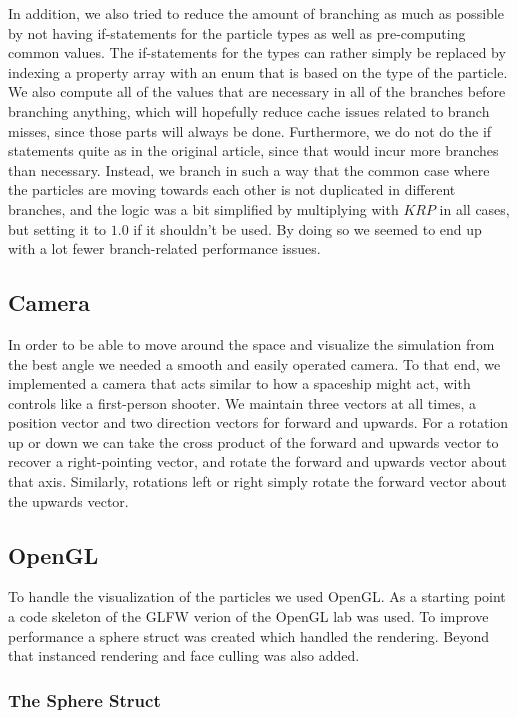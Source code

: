 \documentclass[a4paper]{article}
\begin{document}
In addition, we also tried to reduce the amount of branching as much as possible by not having if-statements for the particle types as well as pre-computing common values.
The if-statements for the types can rather simply be replaced by indexing a property array with an enum that is based on the type of the particle.
We also compute all of the values that are necessary in all of the branches before branching anything, which will hopefully reduce cache issues related to branch misses, since those parts will always be done.
Furthermore, we do not do the if statements quite as in the original article, since that would incur more branches than necessary.
Instead, we branch in such a way that the common case where the particles are moving towards each other is not duplicated in different branches, and the logic was a bit simplified by multiplying with $KRP$ in all cases, but setting it to $1.0$ if it shouldn't be used.
By doing so we seemed to end up with a lot fewer branch-related performance issues.


\subsection{Camera}

In order to be able to move around the space and visualize the simulation from the best angle we needed a smooth and easily operated camera.
To that end, we implemented a camera that acts similar to how a spaceship might act, with controls like a first-person shooter.
We maintain three vectors at all times, a position vector and two direction vectors for forward and upwards.
For a rotation up or down we can take the cross product of the forward and upwards vector to recover a right-pointing vector, and rotate the forward and upwards vector about that axis.
Similarly, rotations left or right simply rotate the forward vector about the upwards vector.

\subsection{OpenGL}

To handle the visualization of the particles we used OpenGL\cite{opengl}. 
As a starting point a code skeleton of the GLFW verion of the OpenGL lab was used. 
To improve performance a sphere struct was created which handled the rendering. 
Beyond that instanced rendering and face culling was also added. 

\subsubsection{The Sphere Struct}
\label{sphere_struct}
\end{document}
